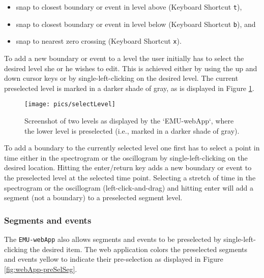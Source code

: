 \documentclass[
]{book}
\providecommand{\tightlist}{%
  \setlength{\itemsep}{0pt}\setlength{\parskip}{0pt}}
\begin{document}
\begin{itemize}
\tightlist
\item
  snap to closest boundary or event in level above (Keyboard Shortcut \texttt{t}),
\item
  snap to closest boundary or event in level below (Keyboard Shortcut \texttt{b}), and
\item
  snap to nearest zero crossing (Keyboard Shortcut \texttt{x}).
\end{itemize}

To add a new boundary or event to a level the user initially has to select the desired level she or he wishes to edit. This is achieved either by using the up and down cursor keys or by single-left-clicking on the desired level. The current preselected level is marked in a darker shade of gray, as is displayed in Figure \ref{fig:webApp-selectLevel}.

\begin{figure}

{\centering \texttt{[image: pics/selectLevel]} 

}

\caption{Screenshot of two levels as displayed by the `EMU-webApp`, where the lower level is preselected (i.e., marked in a darker shade of gray).}\label{fig:webApp-selectLevel}
\end{figure}

To add a boundary to the currently selected level one first has to select a point in time either in the spectrogram or the oscillogram by single-left-clicking on the desired location. Hitting the enter/return key adds a new boundary or event to the preselected level at the selected time point. Selecting a stretch of time in the spectrogram or the oscillogram (left-click-and-drag) and hitting enter will add a segment (not a boundary) to a preselected segment level.

\hypertarget{segments-events}{%
\subsubsection*{Segments and events}\label{segments-events}}

The \texttt{EMU-webApp} also allows segments and events to be preselected by single-left-clicking the desired item. The web application colors the preselected segments and events yellow to indicate their pre-selection as displayed in Figure \ref{fig:webApp-preSelSeg}.
\end{document}
